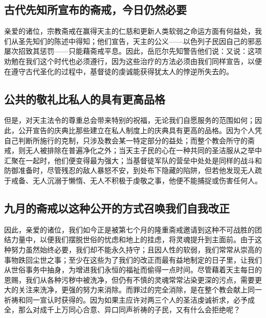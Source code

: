 \par


\subsection{古代先知所宣布的斋戒，今日仍然必要}

亲爱的诸位，宗教斋戒在赢得天主的仁慈和更新人类软弱之命运方面有何益处，我们从圣先知们的陈述中得知；他们宣告，天主的公义——以色列子民因自己的邪恶屡次招致其惩罚——只能藉斋戒平息。因此，岳厄尔先知警告他们说：又说：这项劝勉在我们这个时代也必须遵行，因为这些治疗的方法必须由我们同样宣告，以便在遵守古代圣化的过程中，基督徒的虔诚能获得犹太人的悖逆所失去的。\par


\subsection{公共的敬礼比私人的具有更高品格}

但是，对天主法令的尊重总会带来特别的祝福，无论我们自愿服务的范围如何；因此，公开宣告的庆典比那些建立在私人制度上的庆典具有更高的品格。因为个人凭自己判断所施行的克制，只涉及教会某一特定部分的益处；而整个教会所守的斋戒，则无人被排除在普遍净化之外；当天主子民的心在一种共同的圣洁服从之举中汇聚在一起时，他们便变得最为强大；当基督徒军队的营垒中处处是同样的战斗和防御准备时，尽管残忍的敌人暴怒不安，到处布下隐藏的陷阱，但若他发现无人疏于戒备、无人沉溺于懒惰、无人不积极于虔敬之事，他便不能捕捉或伤害任何人。\par


\subsection{九月的斋戒以这种公开的方式召唤我们自我改正}

因此，亲爱的诸位，我们如今正是被第七个月的隆重斋戒邀请到这种不可战胜的团结力量中，以便我们摆脱世俗的忧虑和地上的挂虑，将灵魂提升到主面前。由于这种努力虽然始终必要，我们却不能永久持守；且因人性的软弱，我们常常从崇高的事物跌回尘世之事；至少在这些为了我们的改正而最有益地制定的日子里，让我们从世俗事务中抽身，为增进我们永恒的福祉而偷得一点时间。尽管藉着天主每日的恩赐，我们从各种污秽中被洗净，但仍有不慎的灵魂常常沾染更深的污点，需要更大的关注来洗净，更强的努力来消除。而罪过的完全消除，是在整个教会献上同一祈祷和同一宣认时获得的。因为如果主应许对两三个人的圣洁虔诚祈求，必予成全，那么对成千上万同心合意、异口同声祈祷的子民，又有什么会拒绝呢？\par

